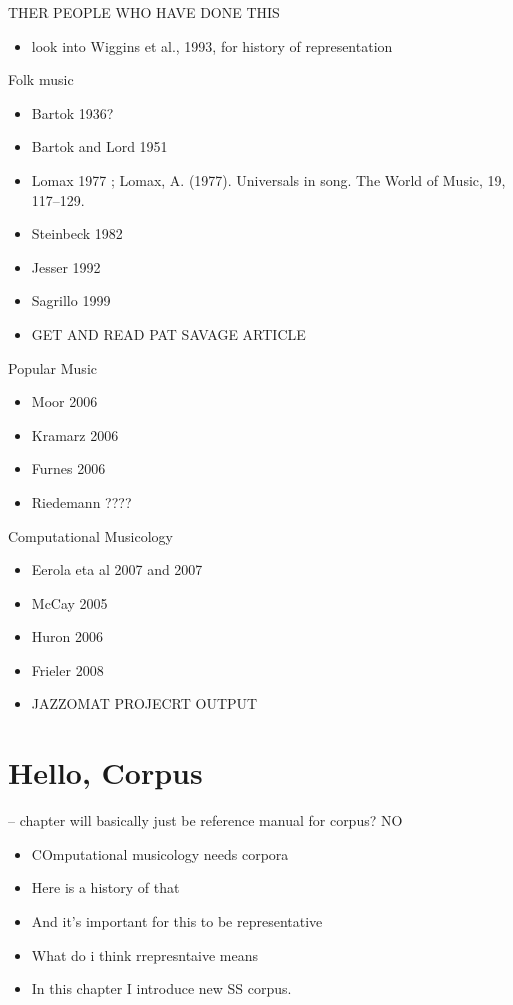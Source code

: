\documentclass[]{book}
\providecommand{\tightlist}{%
  \setlength{\itemsep}{0pt}\setlength{\parskip}{0pt}}
\begin{document}
THER PEOPLE WHO HAVE DONE THIS

\begin{itemize}
\tightlist
\item
  look into Wiggins et al., 1993, for history of representation
\end{itemize}

Folk music

\begin{itemize}
\item
  Bartok 1936?
\item
  Bartok and Lord 1951
\item
  Lomax 1977 ; Lomax, A. (1977). Universals in song. The World of Music, 19, 117--129.
\item
  Steinbeck 1982
\item
  Jesser 1992
\item
  Sagrillo 1999
\item
  GET AND READ PAT SAVAGE ARTICLE
\end{itemize}

Popular Music

\begin{itemize}
\tightlist
\item
  Moor 2006
\item
  Kramarz 2006
\item
  Furnes 2006
\item
  Riedemann ????
\end{itemize}

Computational Musicology

\begin{itemize}
\tightlist
\item
  Eerola eta al 2007 and 2007
\item
  McCay 2005
\item
  Huron 2006
\item
  Frieler 2008
\item
  JAZZOMAT PROJECRT OUTPUT
\end{itemize}

\hypertarget{hello-corpus}{%
\chapter{Hello, Corpus}\label{hello-corpus}}

-- chapter will basically just be reference manual for corpus?
NO

\begin{itemize}
\tightlist
\item
  COmputational musicology needs corpora
\item
  Here is a history of that
\item
  And it's important for this to be representative
\item
  What do i think rrepresntaive means
\item
  In this chapter I introduce new SS corpus.
\end{itemize}
\end{document}
